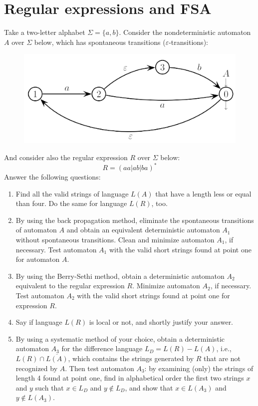\documentclass[12pt, a4paper]{report}
\begin{document}
    \section{Regular expressions and FSA}
        Take a two-letter alphabet $\Sigma=\{a,b\}$.  Consider the nondeterministic automaton $A$ over $\Sigma$ below, which has spontaneous transitions ($\varepsilon$-transitions): 
        \begin{figure}[H]
            \centering
            \includegraphics[width=0.5\linewidth]{images/FSA1a.png}
        \end{figure}
        And consider also the regular expression $R$ over $\Sigma$ below:
        \[R=\left( aa|ab|ba \right)^{*}\]
        Answer the following questions:
        \begin{enumerate}
            \item Find all the valid strings of language $L(A)$ that have a length less or equal than four. Do the same for language $L(R)$, too.
            \item By using the back propagation method, eliminate the spontaneous transitions of automaton $A$ and obtain an equivalent deterministic automaton $A_1$ without spontaneous transitions. 
                Clean and minimize automaton $A_1$, if necessary. Test automaton $A_1$ with the valid short strings found at point one for automaton $A$. 
            \item By using the Berry-Sethi method, obtain a deterministic automaton $A_2$ equivalent to the regular expression $R$. Minimize automaton $A_2$, if necessary. Test automaton $A_2$ with the valid short 
                strings found at point one for expression $R$.
            \item Say if language $L(R)$ is local or not, and shortly justify your answer.
            \item By using a systematic method of your choice, obtain a deterministic automaton $A_3$ for the difference language $L_D=L(R)-L(A)$, i.e., $L(R) \cap \overline{L(A)}$, which contains the strings generated 
                by $R$ that are not recognized by $A$. Then test automaton $A_3$: by examining (only) the strings of length 4 found at point one, find in alphabetical order the first two strings $x$ and $y$ such that
                $x \in L_D$ and $y \notin L_D$, and show that $x \in L(A_3)$ and $y \notin L(A_3)$.
        \end{enumerate}
\end{document}
